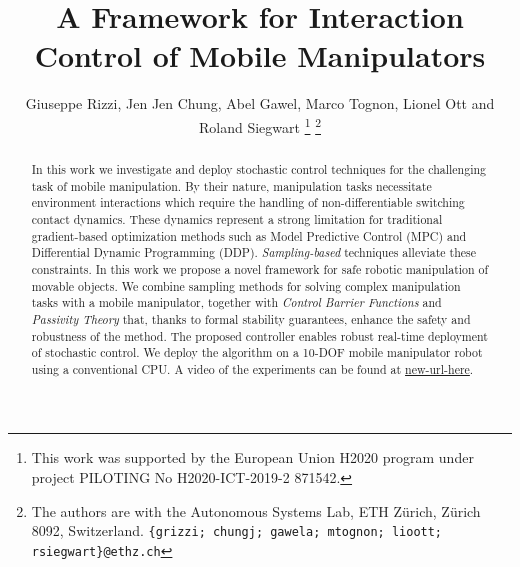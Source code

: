 \documentclass[letterpaper, 10 pt, conference]{ieeeconf}  %
\title{\LARGE \bf
A Framework for Interaction Control of Mobile Manipulators
}
\author{Giuseppe Rizzi, Jen Jen Chung, Abel Gawel, Marco Tognon, Lionel Ott and Roland Siegwart%
\thanks{This work was supported by the European Union H2020 program under project PILOTING No H2020-ICT-2019-2 871542.}
\thanks{The authors are with the Autonomous Systems Lab, ETH Z\"urich, Z\"urich 8092, Switzerland. {\tt\small\{grizzi; chungj; gawela; mtognon; lioott; rsiegwart\}@ethz.ch}}%
}
\begin{document}
\maketitle
\thispagestyle{empty}
\pagestyle{empty}


\begin{abstract}

In this work we investigate and deploy stochastic control techniques for the challenging task of mobile manipulation. By their nature, manipulation tasks necessitate environment interactions which require the handling of non-differentiable switching contact dynamics. These dynamics represent a strong limitation for traditional gradient-based optimization methods such as Model Predictive Control (MPC) and Differential Dynamic Programming (DDP). \emph{Sampling-based} techniques alleviate these constraints. In this work we propose a novel framework for safe robotic manipulation of movable objects. We combine sampling methods for solving complex manipulation tasks with a mobile manipulator, together with \emph{Control Barrier Functions} and \emph{Passivity Theory} that, thanks to formal stability guarantees, enhance the safety and robustness of the method. The proposed controller enables robust real-time deployment of stochastic control. We deploy the algorithm on a 10-DOF mobile manipulator robot using a conventional CPU. A video of the experiments can be found at \url{new-url-here}.
\end{abstract}


















\end{document}
